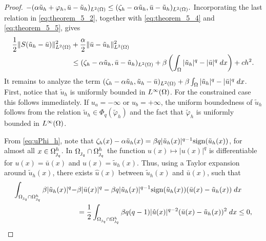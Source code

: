 {\begin{proof}
$
-(\alpha \tilde u_h+\varphi_h,\bar u-\tilde u_h)_{L^2(\Omega)}\le (\zeta_h-\alpha \tilde u_h,\bar u-\tilde u_h)_{L^2(\Omega)}.
$
Incorporating the last relation in \eqref{eq:theorem_5_2}, together with \eqref{eq:theorem_5_4} and \eqref{eq:theorem_5_5}, gives
\begin{align}
\frac{1}{2}\lVert S(\tilde u_h-\bar u) \rVert_{L^2(\Omega)}^2&+ \frac{\alpha}{2}\lVert \bar u-\tilde u_h \rVert_{L^2(\Omega)}^2 \nonumber\\ &\leq (\zeta_h-\alpha \tilde u_h,\bar u-\tilde u_h)_{L^2(\Omega)} +\beta \left(\int_{\Omega}|\tilde u_h|^q-|\bar u|^q\; dx\right) + ch^2.
\end{align}
%
It remains to analyze the term $(\zeta_h-\alpha \tilde u_h,\tilde u_h-\bar u)_{L^2(\Omega)}+\beta \int_{\Omega}|\tilde u_h|^q-|\bar u|^q\; dx$. First, notice that $\tilde u_h$ is uniformly bounded in $L^\infty(\Omega)$. For the constrained case this follows immediately. If $u_a=-\infty$ or $u_b=+\infty$, the uniform boundedness of $\tilde u_h$ follows from the relation $\tilde u_h \in \Phi_q(\tilde \varphi_h)$ and the fact that $\tilde\varphi_h$ is uniformly bounded in $L^\infty(\Omega)$.

From \eqref{eq:uPhi_h}, note that $\zeta_h(x)-\alpha \tilde u_h(x)=\beta q|\tilde u_h(x)|^{q-1}\mathrm{sign}(\tilde u_h(x))$, for almost all $x\in \Omega_{\operatorname{\jmath}_q}^h$. In $\Omega_{\operatorname{\jmath}_q}\cap \Omega_{\operatorname{\jmath}_q}^h$ the function $u(x)\mapsto |u(x)|^q$ is differentiable for $u(x)=\bar u(x)$ and $u(x)=\tilde u_h(x)$. Thus, using a Taylor expansion around $\tilde u_h(x)$, there exists $\hat{u}(x)$ between $\tilde u_h(x)$ and $\bar u(x)$, such that   
% 
\begin{align}
\int_{\Omega_{\operatorname{\jmath}_q}\cap \Omega_{\operatorname{\jmath}_q}^h}\beta |\tilde u_h(x)|^q-&\beta |\bar u(x)|^q-\beta q |\tilde u_h(x)|^{q-1}\mathrm{sign}(\tilde u_h(x))(\bar u(x)-\tilde u_h(x))\; dx \nonumber\\
&=\frac{1}{2}\int_{\Omega_{\operatorname{\jmath}_q}\cap \Omega_{\operatorname{\jmath}_q}^h}\beta q(q-1)|\hat{u}(x)|^{q-2}(\bar u(x)-\tilde u_h(x))^2\; dx\le 0, \label{eq:theorem_5_6}
\end{align}


\end{proof}}
